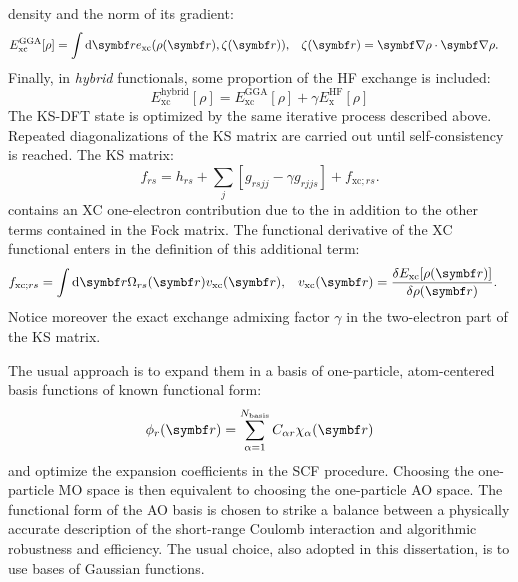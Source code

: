 density and the norm of its gradient:
\begin{alignat}{2}
 E^\mathrm{GGA}_\mathrm{xc}[\rho] = \int\diff\vect{r}
 e_\mathrm{xc}(\rho(\vect{r}),\zeta(\vect{r})),
 \quad&
 \zeta(\vect{r}) = \vect{\nabla}\rho\cdot \vect{\nabla}\rho.
\end{alignat}
Finally, in \emph{hybrid} functionals, some proportion of the
\acrshort{HF} exchange is included:
\begin{equation}
 E^\mathrm{hybrid}_\mathrm{xc}[\rho] = E^\mathrm{GGA}_\mathrm{xc}[\rho] + \gamma E^\mathrm{HF}_\mathrm{x}[\rho]
\end{equation}
The \acrshort{KS}-\acrshort{DFT} state is optimized by the same
iterative process described above.
Repeated diagonalizations of the \acrshort{KS} matrix are carried out
until self-consistency is reached.
The \acrshort{KS} matrix:
\begin{equation}\label{eq:ksmatrix}
  f_{rs} = h_{rs} + \sum_{j}[g_{rsjj} - \gamma g_{rjjs}] + f_{\mathrm{xc};rs}.
\end{equation}
contains an \acrshort{XC} one-electron contribution due to the
in addition to the other terms contained in the Fock matrix.
The functional derivative of the \acrshort{XC} functional enters in the
definition of this additional term:
\begin{alignat}{2}
  f_{\mathrm{xc}; rs}
  =
  \int\diff\vect{r}\Omega_{rs}(\vect{r})v_\mathrm{xc}(\vect{r}),
  \quad&
  v_\mathrm{xc}(\vect{r})
  =
  \frac{\delta E_\mathrm{xc}[\rho(\vect{r})]}{\delta \rho(\vect{r})}.
\end{alignat}
Notice moreover the exact exchange admixing factor $\gamma$ in the
two-electron part of the \acrshort{KS} matrix.

 The usual approach is to expand them in
a basis of one-particle, atom-centered basis functions of known
functional form:
\begin{equation}
  \phi_r(\vect{r})
  =
  \sum_{\alpha=1}^{N_\mathrm{basis}}
  C_{\alpha r}\chi_{\alpha}(\vect{r})
\end{equation}
and optimize the expansion coefficients in the \acrshort{SCF} procedure.
Choosing the one-particle \acrshort{MO} space is then equivalent to
choosing the one-particle \gls{AO} space.
The functional form of the \acrshort{AO} basis is chosen to strike a
balance between a physically accurate description of the short-range
Coulomb interaction and algorithmic robustness and
efficiency.\autocite{Helgaker2000-tz}
The usual choice, also adopted in this dissertation, is to use bases of
Gaussian functions.\autocite{Helgaker1995-gi, Reine2012-tq}

